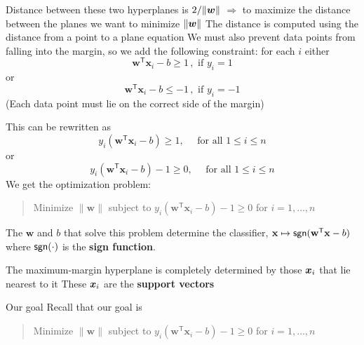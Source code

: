 \documentclass[aspectratio=169]{beamer}\usepackage[]{graphicx}\usepackage[]{xcolor}
\begin{document}
\begin{frame}
    Distance between these two hyperplanes is $2/\|\bm{w}\|$
    \vfill
    $\Rightarrow$ to maximize the distance between the planes we want to minimize $\|\bm{w}\|$
    \vfill
    The distance is computed using the distance from a point to a plane equation
    \vfill
    We must also prevent data points from falling into the margin, so we add the following constraint: for each $i$ either
    \[
        \mathbf{w}^\mathsf{T} \mathbf{x}_i - b \ge 1 \, , \text{ if } y_i = 1
    \]
    or
    \[
        \mathbf{w}^\mathsf{T} \mathbf{x}_i - b \le -1 \, , \text{ if } y_i = -1
    \]
    \vfill
    (Each data point must lie on the correct side of the margin)
\end{frame}

\begin{frame}
    This can be rewritten as
    \[
        y_i(\mathbf{w}^\mathsf{T} \mathbf{x}_i - b) \ge 1, \quad \text{ for all } 1 \le i \le n
    \]
    or
    \[
        y_i(\mathbf{w}^\mathsf{T} \mathbf{x}_i - b)-1\geq 0, \quad \text{ for all } 1 \le i \le n
    \]
    \vfill
    We get the optimization problem:
    \begin{quote}
        Minimize $\|\mathbf{w}\|$ subject to $y_i(\mathbf{w}^\mathsf{T} \mathbf{x}_i - b)-1 \ge 0$ for $i = 1, \ldots, n$
    \end{quote}
    \vfill
    The $\mathbf{w}$ and $b$ that solve this problem determine the classifier, $\mathbf{x} \mapsto \mathsf{sgn}(\mathbf{w}^\mathsf{T} \mathbf{x} - b)$ where $\mathsf{sgn}(\cdot)$ is the \textbf{sign function}.
\end{frame}

\begin{frame}   
    The maximum-margin hyperplane is completely determined by those $\bm{x}_i$ that lie nearest to it
    \vfill
    These $\bm{x}_i$ are the \textbf{support vectors}
\end{frame}





\begin{frame}{Our goal}
    Recall that our goal is
    \vfill
    \begin{quote}
        Minimize $\|\mathbf{w}\|$ subject to $y_i(\mathbf{w}^\mathsf{T} \mathbf{x}_i - b)-1 \ge 0$ for $i = 1, \ldots, n$
    \end{quote}
\end{frame}    
\end{document}
